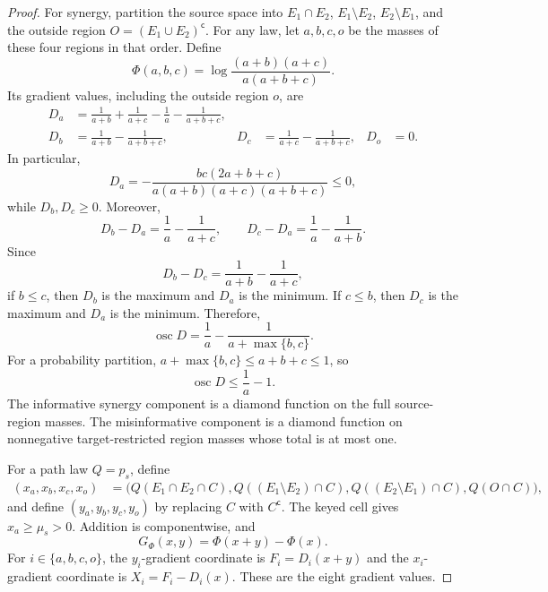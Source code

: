 \documentclass[11pt]{article}
\theoremstyle{definition}
\begin{document}
\begin{proof}
For synergy, partition the source space into $E_1\cap E_2$, $E_1\setminus E_2$,
$E_2\setminus E_1$, and the outside region $O=(E_1\cup E_2)^{\mathsf c}$.  For any law, let
$a,b,c,o$ be the masses of these four regions in that order.  Define
\begin{equation}
  \Phi(a,b,c)
  =
  \log\frac{(a+b)(a+c)}{a(a+b+c)}.
\end{equation}
Its gradient values, including the outside region $o$, are
\begin{align}
  D_a
    &=\frac1{a+b}+\frac1{a+c}-\frac1a-\frac1{a+b+c},\\
  D_b
    &=\frac1{a+b}-\frac1{a+b+c},&
  D_c
    &=\frac1{a+c}-\frac1{a+b+c},&
  D_o&=0.
\end{align}
In particular,
\[
  D_a
  =
  -\frac{bc(2a+b+c)}
    {a(a+b)(a+c)(a+b+c)}
  \le0,
\]
while $D_b,D_c\ge0$.  Moreover,
\begin{equation}
  D_b-D_a=\frac1a-\frac1{a+c},
  \qquad
  D_c-D_a=\frac1a-\frac1{a+b}.
\end{equation}
Since
\[
  D_b-D_c=\frac1{a+b}-\frac1{a+c},
\]
if $b\le c$, then $D_b$ is the maximum and $D_a$ is the minimum.  If $c\le b$, then $D_c$ is the
maximum and $D_a$ is the minimum.  Therefore,
\begin{equation}\label{eq:exact-ordinary-diamond-diameter}
  \operatorname{osc}D
  =
  \frac1a-\frac1{a+\max\{b,c\}}.
\end{equation}
For a probability partition,
$a+\max\{b,c\}\le a+b+c\le1$, so
\begin{equation}\label{eq:probability-ordinary-diamond-diameter}
  \operatorname{osc}D\le\frac1a-1.
\end{equation}
The informative synergy component is a diamond function on the full source-region masses.  The
misinformative component is a diamond function on nonnegative target-restricted region masses
whose total is at most one.

For a path law $Q=p_s$, define
\begin{align}
  (x_a,x_b,x_c,x_o)
  &=
  \bigl(
    Q(E_1\cap E_2\cap C),
    Q((E_1\setminus E_2)\cap C),
    Q((E_2\setminus E_1)\cap C),
    Q(O\cap C)
  \bigr),
\end{align}
and define $(y_a,y_b,y_c,y_o)$ by replacing $C$ with $C^{\mathsf c}$.  The keyed cell gives
$x_a\ge\mu_s>0$.  Addition is componentwise, and
\begin{equation}
  G_\Phi(x,y)=\Phi(x+y)-\Phi(x).
\end{equation}
For $i\in\{a,b,c,o\}$, the $y_i$-gradient coordinate is $F_i=D_i(x+y)$ and the
$x_i$-gradient coordinate is $X_i=F_i-D_i(x)$.  These are the eight gradient values.


\end{proof}
\end{document}
